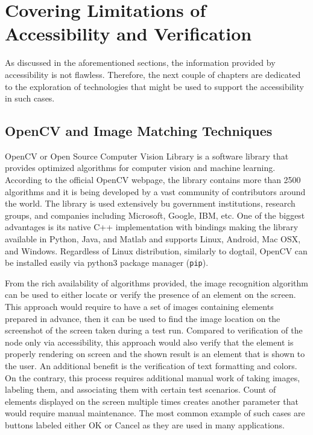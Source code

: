 \section{Covering Limitations of Accessibility and Verification}
As discussed in the aforementioned sections, the information provided by accessibility is not flawless. Therefore, the next couple of chapters are dedicated to the exploration of technologies that might be used to support the accessibility in such cases.

\subsection{OpenCV and Image Matching Techniques}
OpenCV or Open Source Computer Vision Library is a software library that provides optimized algorithms for computer vision and machine learning. According to the official OpenCV webpage\cite{opencv}, the library contains more than 2500 algorithms and it is being developed 
by a vast community of contributors around the world. The library is used extensively bu government institutions, research groups, and companies including Microsoft, Google, IBM, etc. One of the biggest advantages is its native C++ implementation with bindings making the library available in Python, Java, and Matlab and supports Linux, Android, Mac OSX, and Windows. Regardless of Linux distribution, similarly to dogtail, OpenCV can be installed easily via python3 package manager (\texttt{pip}). 

From the rich availability of algorithms provided, the image recognition algorithm can be used to either locate or verify the presence of an element on the screen. This approach would require to have a set of images containing elements prepared in advance, then it can be used to find the image location on the screenshot of the screen taken during a test run. Compared to verification of the node only via accessibility, this approach would also verify that the element is properly rendering on screen and the shown result is an element that is shown to the user. An additional benefit is the verification of text formatting and colors. On the contrary, this process requires additional manual work of taking images, labeling them, and associating them with certain test scenarios. Count of elements displayed on the screen multiple times creates another parameter that would require manual maintenance. The most common example of such cases are buttons labeled either OK or Cancel as they are used in many applications.

